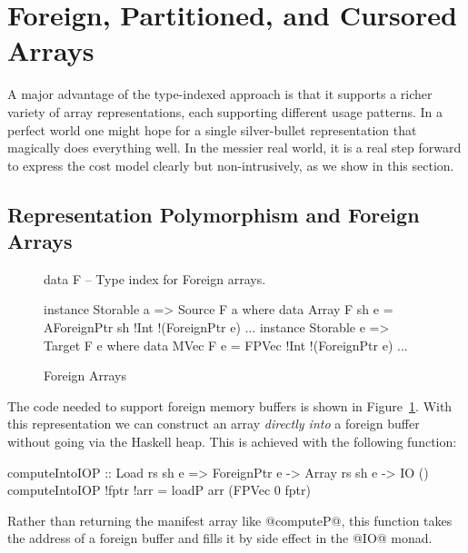 
\eject{}
\section{Foreign, Partitioned, and Cursored Arrays}
\label{section:rich-structure}

A major advantage of the type-indexed approach is that it supports a richer variety of array representations, each supporting different usage patterns. In a perfect world one might hope for a single silver-bullet representation that magically does everything well. In the messier real world, it is a real step forward to express the cost model clearly but non-intrusively, as we show in this section.

\subsection{Representation Polymorphism and Foreign Arrays}
\label{section:ReprPoly}
\begin{figure}
\begin{small}
\begin{code}
data F  -- Type index for Foreign arrays.

instance Storable a => Source F a where
 data Array F sh e
   = AForeignPtr sh !Int !(ForeignPtr e)
  ...
instance Storable e => Target F e where
 data MVec F e = FPVec !Int !(ForeignPtr e)
 ...
\end{code}
\caption{Foreign Arrays}
\label{figure:ForeignArrays}
\end{small}
\end{figure}

The code needed to support foreign memory buffers is shown in Figure~\ref{figure:ForeignArrays}. With this representation we can construct an array \emph{directly into} a foreign buffer without going via the Haskell heap. This is achieved with the following function:
\par
\begin{small}
\begin{code}
 computeIntoIOP :: Load rs sh e
                => ForeignPtr e -> Array rs sh e -> IO ()
 computeIntoIOP !fptr !arr = loadP arr (FPVec 0 fptr)
\end{code}
\end{small} \par
Rather than returning the manifest array like @computeP@, this function takes the address of a foreign buffer and fills it by side effect in the @IO@ monad.

